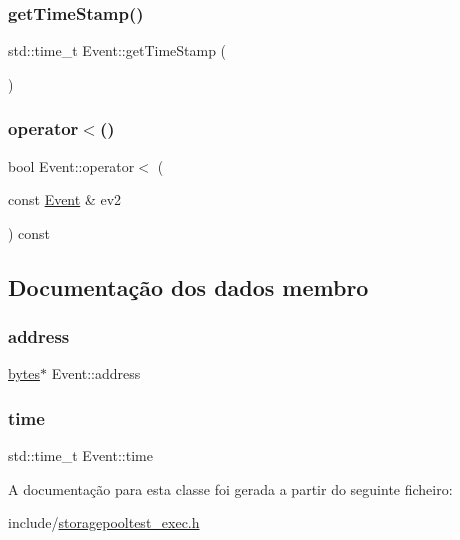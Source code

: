 \subsubsection{\texorpdfstring{get\+Time\+Stamp()}{getTimeStamp()}}
{\footnotesize\ttfamily std\+::time\+\_\+t Event\+::get\+Time\+Stamp (\begin{DoxyParamCaption}{ }\end{DoxyParamCaption})\hspace{0.3cm}{\ttfamily [inline]}}

\mbox{\label{classEvent_adc997c0b38105e44e659bcd339699bd8}} 
\subsubsection{\texorpdfstring{operator$<$()}{operator<()}}
{\footnotesize\ttfamily bool Event\+::operator$<$ (\begin{DoxyParamCaption}\item[{const \hyperlink{classEvent}{Event} \&}]{ev2 }\end{DoxyParamCaption}) const\hspace{0.3cm}{\ttfamily [inline]}}



\subsection{Documentação dos dados membro}
\mbox{\label{classEvent_ab97f39d1ca773c8756d319bf8acad6f4}} 
\subsubsection{\texorpdfstring{address}{address}}
{\footnotesize\ttfamily \hyperlink{storagepooltest__exec_8h_a9192c6634956b334d70312524e15a909}{bytes}$\ast$ Event\+::address}

\mbox{\label{classEvent_a3f96ab977c7b3b16edf59e8f96193ac0}} 
\subsubsection{\texorpdfstring{time}{time}}
{\footnotesize\ttfamily std\+::time\+\_\+t Event\+::time}



A documentação para esta classe foi gerada a partir do seguinte ficheiro\+:\begin{DoxyCompactItemize}
\item 
include/\hyperlink{storagepooltest__exec_8h}{storagepooltest\+\_\+exec.\+h}\end{DoxyCompactItemize}
